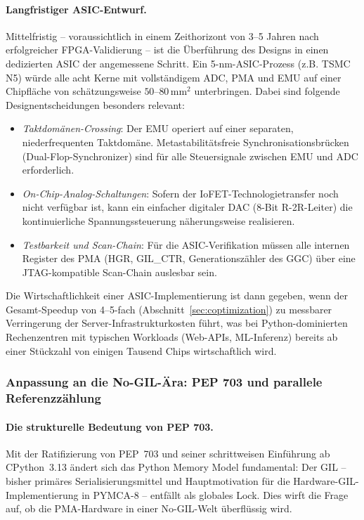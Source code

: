 ﻿\documentclass[a4paper,12pt]{scrreprt}
\theoremstyle{definition}
\begin{document}
	\paragraph{Langfristiger ASIC-Entwurf.}
	Mittelfristig -- voraussichtlich in einem Zeithorizont von 3--5 Jahren nach
	erfolgreicher FPGA-Validierung -- ist die Überführung des Designs in einen
	dedizierten ASIC der angemessene Schritt. Ein 5-nm-ASIC-Prozess (z.B. TSMC N5)
	würde alle acht Kerne mit vollständigem ADC, PMA und EMU auf einer Chipfläche
	von schätzungsweise $50$--$80\,\mathrm{mm}^2$ unterbringen. Dabei sind folgende
	Designentscheidungen besonders relevant:
	\begin{itemize}[noitemsep]
		\item \emph{Taktdomänen-Crossing}: Der EMU operiert auf einer separaten,
		niederfrequenten Taktdomäne. Metastabilitätsfreie Synchronisationsbrücken
		(Dual-Flop-Synchronizer) sind für alle Steuersignale zwischen EMU und ADC
		erforderlich.
		\item \emph{On-Chip-Analog-Schaltungen}: Sofern der IoFET-Technologietransfer
		noch nicht verfügbar ist, kann ein einfacher digitaler DAC (8-Bit R-2R-Leiter)
		die kontinuierliche Spannungssteuerung näherungsweise realisieren.
		\item \emph{Testbarkeit und Scan-Chain}: Für die ASIC-Verifikation müssen
		alle internen Register des PMA (HGR, GIL\_CTR, Generationszähler des GGC)
		über eine JTAG-kompatible Scan-Chain auslesbar sein.
	\end{itemize}
	Die Wirtschaftlichkeit einer ASIC-Implementierung ist dann gegeben, wenn der
	Gesamt-Speedup von 4--5-fach (Abschnitt~\ref{sec:coptimization}) zu messbarer
	Verringerung der Server-Infrastrukturkos\-ten führt, was bei Python-dominierten
	Rechenzentren mit typischen Workloads (Web-APIs, ML-Inferenz) bereits ab einer
	Stückzahl von einigen Tausend Chips wirtschaftlich wird.

	\subsubsection{Anpassung an die No-GIL-Ära: PEP 703 und parallele Referenzzählung}

	\paragraph{Die strukturelle Bedeutung von PEP 703.}
	Mit der Ratifizierung von PEP~703 \cite{python_pep703} und seiner schrittweisen
	Einführung ab CPython~3.13 ändert sich das Python Memory Model fundamental:
	Der GIL -- bisher primäres Serialisierungsmittel und Hauptmotivation für die
	Hardware-GIL-Implementierung in PYMCA-8 -- entfällt als globales Lock.
	Dies wirft die Frage auf, ob die PMA-Hardware in einer No-GIL-Welt überflüssig wird.
\end{document}
